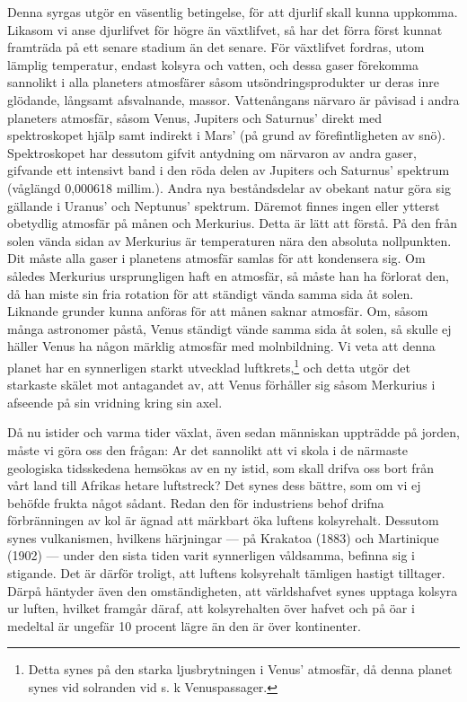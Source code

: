 \documentclass[a4paper, 12pt, oneside, swedish]{article}
\begin{document}
Denna syrgas utgör en väsentlig betingelse, för att djurlif skall kunna uppkomma. Likasom vi anse djurlifvet för högre än växtlifvet, så har det förra först kunnat framträda på ett senare stadium än det senare. För växtlifvet fordras, utom lämplig temperatur, endast kolsyra och vatten, och dessa gaser förekomma sannolikt i alla planeters atmosfärer såsom utsöndringsprodukter ur deras inre glödande, långsamt afsvalnande, massor. Vattenångans närvaro är påvisad i andra planeters atmosfär, såsom Venus, Jupiters och Saturnus' direkt med spektroskopet hjälp samt indirekt i Mars' (på grund av förefintligheten av snö). Spektroskopet har dessutom gifvit antydning om närvaron av andra gaser, gifvande ett intensivt band i den röda delen av Jupiters och Saturnus' spektrum (våglängd 0,000618 millim.). Andra nya beståndsdelar av obekant natur göra sig gällande i Uranus' och Neptunus' spektrum. Däremot finnes ingen eller ytterst obetydlig atmosfär på månen och Merkurius. Detta är lätt att förstå. På den från solen vända sidan av Merkurius är temperaturen nära den absoluta nollpunkten. Dit måste alla gaser i planetens atmosfär samlas för att kondensera sig. Om således Merkurius ursprungligen haft en atmosfär, så måste han ha förlorat den, då han miste sin fria rotation för att ständigt vända samma sida åt solen. Liknande grunder kunna anföras för att månen saknar atmosfär. Om, såsom många astronomer påstå, Venus ständigt vände samma sida åt solen, så skulle ej häller Venus ha någon märklig atmosfär med molnbildning. Vi veta att denna planet har en synnerligen starkt utvecklad luftkrets,\footnote{Detta synes på den starka ljusbrytningen i Venus' atmosfär, då denna planet synes vid solranden vid s. k Venuspassager.} och detta utgör det starkaste skälet mot antagandet av, att Venus förhåller sig såsom Merkurius i afseende på sin vridning kring sin axel.

Då nu istider och varma tider växlat, även sedan människan uppträdde på jorden, måste vi göra oss den frågan: Ar det sannolikt att vi skola i de närmaste geologiska tidsskedena hemsökas av en ny istid, som skall drifva oss bort från vårt land till Afrikas hetare luftstreck? Det synes dess bättre, som om vi ej behöfde frukta något sådant. Redan den för industriens behof drifna förbränningen av kol är ägnad att märkbart öka luftens kolsyrehalt. Dessutom synes vulkanismen, hvilkens härjningar --- på Krakatoa (1883) och Martinique (1902) --- under den sista tiden varit synnerligen våldsamma, befinna sig i stigande. Det är därför troligt, att luftens kolsyrehalt tämligen hastigt tilltager. Därpå häntyder även den omständigheten, att världshafvet synes upptaga kolsyra ur luften, hvilket framgår däraf, att kolsyrehalten över hafvet och på öar i medeltal är ungefär 10 procent lägre än den är över kontinenter.
\end{document}
